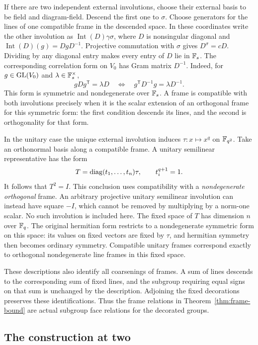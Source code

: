 If there are two independent external involutions, choose their external
basis to be field and diagram-field.  Descend the first one to $\sigma$.
Choose generators for the lines of one compatible frame in the descended
space.  In these coordinates write the other involution as
$\operatorname{Int}(D)\gamma\sigma$, where $D$ is nonsingular diagonal
and $\operatorname{Int}(D)(g)=DgD^{-1}$.  Projective
commutation with $\sigma$ gives $D^\sigma=cD$.  Dividing by any diagonal
entry makes every entry of $D$ lie in $\mathbb F_s$.  The corresponding
correlation form on $V_0$ has Gram matrix $D^{-1}$.  Indeed, for
$g\in\operatorname{GL}(V_0)$ and $\lambda\in\mathbb F_s^\times$,
\[
 gDg^{\mathsf T}=\lambda D
 \quad\Longleftrightarrow\quad
 g^{\mathsf T}D^{-1}g=\lambda D^{-1}.
\]
This form is symmetric and nondegenerate over $\mathbb F_s$.
A frame is compatible with both
involutions precisely when it is the scalar extension of an orthogonal
frame for this symmetric form: the first condition descends its lines,
and the second is orthogonality for that form.

In the unitary case the unique external involution induces
$\tau:x\mapsto x^q$ on $\mathbb F_{q^2}$.  Take an orthonormal basis along a
compatible frame.  A unitary semilinear representative has the form
\[
 T=\operatorname{diag}(t_1,\ldots,t_n)\tau,
 \qquad t_i^{q+1}=1.
\]
It follows that $T^2=I$.  This conclusion uses compatibility with a
\emph{nondegenerate orthogonal} frame.  An arbitrary projective unitary
semilinear involution can instead have square $-I$, which cannot be
removed by multiplying by a norm-one scalar.  No such involution is
included here.  The fixed space of $T$ has dimension $n$ over $\mathbb F_q$.
The original hermitian form restricts to a nondegenerate symmetric form
on this space: its values on fixed vectors are fixed by $\tau$, and
hermitian symmetry then becomes ordinary symmetry.  Compatible unitary
frames correspond exactly to orthogonal nondegenerate line frames in
this fixed space.

These descriptions also identify all coarsenings of frames.  A sum of
lines descends to the corresponding sum of fixed lines, and the subgroup
requiring equal signs on that sum is unchanged by the description.
Adjoining the fixed decorations preserves these identifications.  Thus
the frame relations in Theorem~\ref{thm:frame-bound} are actual subgroup
face relations for the decorated groups.

\subsection{The construction at two}

